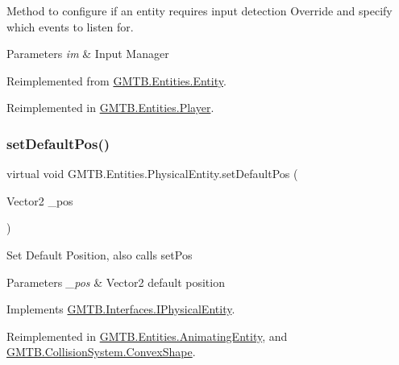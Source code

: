 Method to configure if an entity requires input detection Override and specify which events to listen for. 


\begin{DoxyParams}{Parameters}
{\em im} & Input Manager \\
\hline
\end{DoxyParams}


Reimplemented from \mbox{\hyperlink{class_g_m_t_b_1_1_entities_1_1_entity_a73f4529a619029861fe443f95d13455c}{G\+M\+T\+B.\+Entities.\+Entity}}.



Reimplemented in \mbox{\hyperlink{class_g_m_t_b_1_1_entities_1_1_player_af7c91590f66efe071a0dec4853c30265}{G\+M\+T\+B.\+Entities.\+Player}}.

\mbox{\label{class_g_m_t_b_1_1_entities_1_1_physical_entity_a385d1513107094da5ca2955e91a44bb6}} 
\subsubsection{\texorpdfstring{setDefaultPos()}{setDefaultPos()}}
{\footnotesize\ttfamily virtual void G\+M\+T\+B.\+Entities.\+Physical\+Entity.\+set\+Default\+Pos (\begin{DoxyParamCaption}\item[{Vector2}]{\+\_\+pos }\end{DoxyParamCaption})\hspace{0.3cm}{\ttfamily [virtual]}}



Set Default Position, also calls set\+Pos 


\begin{DoxyParams}{Parameters}
{\em \+\_\+pos} & Vector2 default position\\
\hline
\end{DoxyParams}


Implements \mbox{\hyperlink{interface_g_m_t_b_1_1_interfaces_1_1_i_physical_entity}{G\+M\+T\+B.\+Interfaces.\+I\+Physical\+Entity}}.



Reimplemented in \mbox{\hyperlink{class_g_m_t_b_1_1_entities_1_1_animating_entity_a34e8160516927afb278915c3211b38c5}{G\+M\+T\+B.\+Entities.\+Animating\+Entity}}, and \mbox{\hyperlink{class_g_m_t_b_1_1_collision_system_1_1_convex_shape_ab31e50bc6e7ae58970eb512355608184}{G\+M\+T\+B.\+Collision\+System.\+Convex\+Shape}}.

